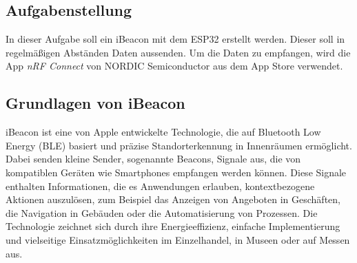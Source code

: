 \documentclass[twoside]{article}
\begin{document}
\subsection{Aufgabenstellung}
In dieser Aufgabe soll ein iBeacon mit dem ESP32 erstellt werden. Dieser soll in regelmäßigen Abständen Daten aussenden. Um die Daten zu empfangen, wird die App \textit{nRF Connect} von NORDIC Semiconductor aus dem App Store verwendet.

\subsection{Grundlagen von iBeacon}
iBeacon ist eine von Apple entwickelte Technologie, die auf Bluetooth Low Energy (BLE) basiert und präzise Standorterkennung in Innenräumen ermöglicht. Dabei senden kleine Sender, sogenannte Beacons, Signale aus, die von kompatiblen Geräten wie Smartphones empfangen werden können. Diese Signale enthalten Informationen, die es Anwendungen erlauben, kontextbezogene Aktionen auszulösen, zum Beispiel das Anzeigen von Angeboten in Geschäften, die Navigation in Gebäuden oder die Automatisierung von Prozessen. Die Technologie zeichnet sich durch ihre Energieeffizienz, einfache Implementierung und vielseitige Einsatzmöglichkeiten im Einzelhandel, in Museen oder auf Messen aus.
\end{document}
